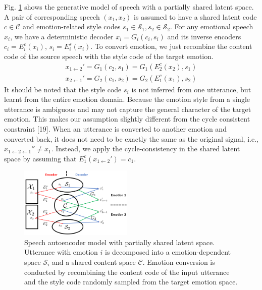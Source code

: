\documentclass{article}
\begin{document}
Fig. \ref{autoencoder} shows the generative model of speech with a partially shared latent space. A pair of corresponding speech $(x_1, x_2)$ is assumed to have a shared latent code $c \in \mathcal{C}$ and emotion-related style codes $s_1 \in \mathcal{S}_1, s_2 \in \mathcal{S}_2$. For any emotional speech $x_i$, we have a deterministic decoder $x_i = G_i(c_i,s_i)$ and its inverse encoders $c_i = E_i^c(x_i)$, $s_i = E_i^s(x_i)$. To convert emotion, we just recombine the content code of the source speech with the style code of the target emotion.
\begin{equation}
\begin{aligned}
x_{1\leftarrow2}' = G_1(c_2, s_1) = G_1(E_2^c(x_2), s_1) \\
x_{2\leftarrow1}' = G_2(c_1, s_2) = G_2(E_1^c(x_1), s_2)
\end{aligned}
\end{equation}
It should be noted that the style code $s_i$ is not inferred from one utterance, but learnt from the entire emotion domain. Because the emotion style from a single utterance is ambiguous and may not capture the general character of the target emotion. This makes our assumption slightly different from the cycle consistent constraint [19]. When an utterance is converted to another emotion and converted back, it does not need to be exactly the same as the original signal, i.e., $x_{1\leftarrow2\leftarrow1}'' \neq x_1$. Instead, we apply the cycle-consistency in the shared latent space by assuming that $E_1^c(x_{1\leftarrow2}') = c_1$.

\begin{figure}[htb]
\includegraphics[width=0.48\textwidth]{FIG/autoencoder}
\caption{Speech autoencoder model with partially shared latent space. Utterance with emotion $i$ is decomposed into a emotion-dependent space $\mathcal{S}_i$ and a shared content space $\mathcal{C}$. Emotion conversion is conducted by recombining the content code of the input utterance and the style code randomly sampled from the target emotion space.}
\label{autoencoder}
\end{figure}
\end{document}
